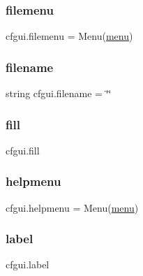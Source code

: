 \mbox{\label{namespacecfgui_ae54e3f8d355a03929c89a227c506d39e}} 
\subsubsection{\texorpdfstring{filemenu}{filemenu}}
{\footnotesize\ttfamily cfgui.\+filemenu = Menu(\mbox{\hyperlink{namespacecfgui_a178f690140e4928e80ed598ebbbf6ec1}{menu}})}

\mbox{\label{namespacecfgui_ae4078f684c5dfbf537a587c88b087e39}} 
\subsubsection{\texorpdfstring{filename}{filename}}
{\footnotesize\ttfamily string cfgui.\+filename = \char`\"{}\char`\"{}}

\mbox{\label{namespacecfgui_a86a27e16bd39f4f3228f753b3f04cb91}} 
\subsubsection{\texorpdfstring{fill}{fill}}
{\footnotesize\ttfamily cfgui.\+fill}

\mbox{\label{namespacecfgui_a3a48ab8eff50c8134be0e6351bc9279d}} 
\subsubsection{\texorpdfstring{helpmenu}{helpmenu}}
{\footnotesize\ttfamily cfgui.\+helpmenu = Menu(\mbox{\hyperlink{namespacecfgui_a178f690140e4928e80ed598ebbbf6ec1}{menu}})}

\mbox{\label{namespacecfgui_a5bb1e89c42bd42a9baf53da59a27658d}} 
\subsubsection{\texorpdfstring{label}{label}}
{\footnotesize\ttfamily cfgui.\+label}


